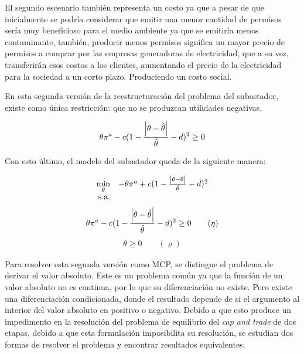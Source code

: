 El segundo escenario también representa un costo ya que a pesar de que inicialmente se podría considerar que emitir una menor cantidad de permisos sería muy beneficioso para el medio ambiente ya que se emitiría menos contaminante, también, producir menos permisos significa un mayor precio de permisos a comprar por las empresas generadoras de electricidad, que a su vez, transferirán esos costos a los clientes, aumentando el precio de la electricidad para la sociedad a un corto plazo. Produciendo un costo social. 
\vspace{2.5mm}

En esta segunda versión de la reestructuración del problema del subastador, existe como única restricción: que no se produzcan utilidades negativas.
\vspace{2.5mm}

\begin{equation}
\begin{array}{rrclcl}
\displaystyle \theta \pi^a - c(1-\frac{\abs{\theta - \hat{\theta}}}{\hat{\theta}}-d)^2 \geq 0  \\
\end{array}
\end{equation}

Con esto último, el modelo del subastador queda de la siguiente manera:

\begin{equation}
\begin{array}{rrclcl}
\displaystyle \min_{\theta} & -\theta \pi^a + c(1-\frac{\abs{\theta - \hat{\theta}}}{\hat{\theta}}-d)^2 \\\textrm{s.a.} \label{fo:social}\\
\end{array}
\end{equation}
\begin{equation}
\begin{array}{rrclcl}
\displaystyle \theta \pi^a - c(1-\frac{\abs{\theta - \hat{\theta}}}{\hat{\theta}}-d)^2 \geq 0 \qquad (\eta)\label{social:r1}
\end{array}
\end{equation}
\begin{equation}
\begin{array}{rrclcl}
\theta \geq 0 \qquad (\varrho)\label{social:r11}
\end{array}
\end{equation}

Para resolver esta segunda versión como MCP, se distingue el problema de derivar el valor absoluto. Este es un problema común ya que la función de un valor absoluto no es continua, por lo que su diferenciación no existe. Pero existe una diferenciación condicionada, donde el resultado depende de si el argumento al interior del valor absoluto en positivo o negativo. Debido a que esto produce un impedimento en la resolución del problema de equilibrio del \textit{cap and trade} de dos etapas, debido a que esta formulación imposibilita su resolución, se estudian dos formas de resolver el problema y encontrar resultados equivalentes. 
\vspace{2.5mm}

